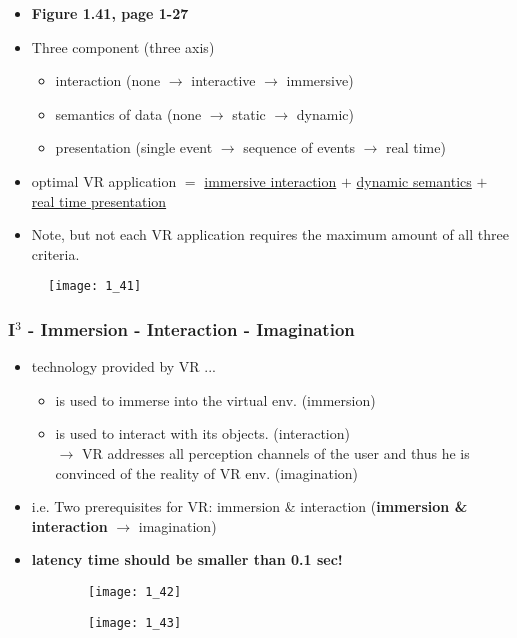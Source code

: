 \documentclass{standalone}
\begin{document}
\begin{itemize}
	\item \textbf{Figure 1.41, page 1-27}
	\item Three component (three axis)
		\begin{itemize} 
			\item interaction (none $\rightarrow$ interactive $\rightarrow$ immersive)
			\item semantics of data (none $\rightarrow$ static $\rightarrow$ dynamic)
			\item presentation (single event $\rightarrow$ sequence of events $\rightarrow$ real time)
		\end{itemize}
	\item optimal VR application $=$ \underline{immersive interaction} $+$ \underline{dynamic semantics} $+$ \underline{real time presentation} 
	\item Note, but not each VR application requires the maximum amount of all three criteria.
\end{itemize}

\begin{figure}[h]
	\texttt{[image: 1\_41]}
\end{figure}

\subsubsection*{I$^3$ - Immersion - Interaction - Imagination}

\begin{itemize}
	\item technology provided by VR ...
		\begin{itemize}
			\item is used to immerse into the virtual env. (immersion)
			\item is used to interact with its objects. (interaction)
			\\ $\rightarrow$ VR addresses all perception channels of the user and thus he is convinced of the reality of VR env. (imagination)
		\end{itemize}
	\item i.e. Two prerequisites for VR: immersion \& interaction (\textbf{immersion \& interaction} $\rightarrow$ imagination)
	\item \textbf{latency time should be smaller than 0.1 sec!}
\end{itemize}

\begin{figure}[H]
	\centering
	\begin{subfigure}[b]{0.45\textwidth}	
		\texttt{[image: 1\_42]}
	\end{subfigure}
	\begin{subfigure}[b]{0.45\textwidth}	
		\texttt{[image: 1\_43]}
	\end{subfigure}
\end{figure}
\end{document}
